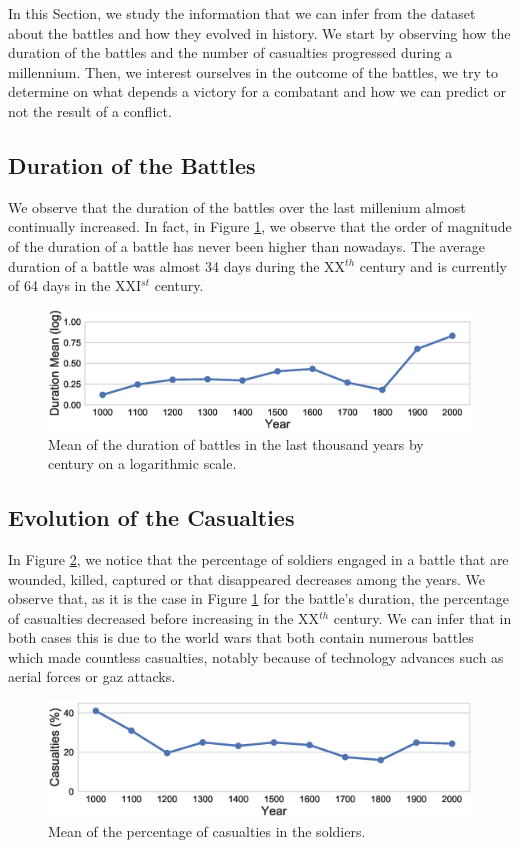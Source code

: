 In this Section, we study the information that we can infer from the dataset about the battles and how they evolved in history. We start by observing how the duration of the battles and the number of casualties progressed during a millennium. Then, we interest ourselves in the outcome of the battles, we try to determine on what depends a victory for a combatant and how we can predict or not the result of a conflict. 
\subsection{Duration of the Battles}

We observe that the duration of the battles over the last millenium almost continually increased. In fact, in Figure \ref{fig:durThByCent}, we observe that the order of magnitude of the duration of a battle has never been higher than nowadays. The average duration of a battle was almost 34 days during the XX$^{th}$ century and is currently of 64 days in the XXI$^{st}$ century.

 \begin{figure}[h]
	\centering	\includegraphics[width=\linewidth]{figures/durThByCent}
	\caption{Mean of the duration of battles in the last thousand years by century on a logarithmic scale.}\label{fig:durThByCent}
	\centering
\end{figure}

\subsection{Evolution of the Casualties}

In Figure \ref{fig:casuPerCent}, we notice that the percentage of soldiers engaged in a battle that are wounded, killed, captured or that disappeared decreases among the years. We observe that, as it is the case in Figure \ref{fig:durThByCent} for the battle's duration, the percentage of casualties decreased before increasing in the XX$^{th}$ century. We can infer that in both cases this is due to the world wars that both contain numerous battles which made countless casualties, notably because of technology advances such as aerial forces or gaz attacks.
 \begin{figure}[h]
	\centering	\includegraphics[width=\linewidth]{figures/casuPerCent}
	\caption{Mean of the percentage of casualties in the soldiers.}\label{fig:casuPerCent}
	\centering
\end{figure}

